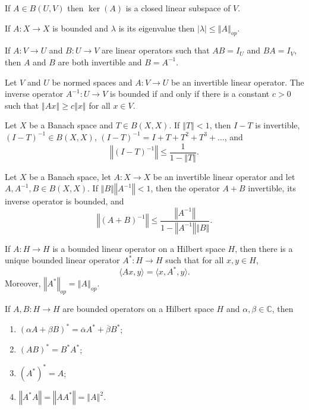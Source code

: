 \documentclass[a4paper]{article}
\newcommand{\C}{\mathbb{C}}
\newcommand{\norm}[1]{\left\Vert #1 \right\Vert}
\newcommand{\oneover}[1]{\frac{1}{#1}}
\newcommand{\<}{\langle}
\renewcommand{\>}{\rangle}
\renewcommand{\a}{\alpha}
\renewcommand{\b}{\beta}
\newcommand{\la}{\lambda}
\newcommand{\inv}{^{-1}}
\begin{document}
\begin{prop}
  If $A\in B(U,V)$ then $\ker(A)$ is a closed linear subspace of $V$.
\end{prop}

\begin{prop}
  If $A:X\to X$ is bounded and $\la$ is its eigenvalue then $|\la|\leq\norm{A}_{op}$.
\end{prop}

\begin{lemma}
  If $A:V\to U$ and $B:U\to V$ are linear operators such that $AB=I_U$ and $BA=I_V$, then $A$ and $B$ are both invertible and $B=A^{-1}$.
\end{lemma}

\begin{prop}
  Let $V$ and $U$ be normed spaces and $A:V\to U$ be an invertible linear operator. The inverse operator $A^{-1}:U\to V$ is bounded if and only if there is a constant $c>0$ such that $\norm{Ax}\geq c\norm{x}$ for all $x\in V$.
\end{prop}

\begin{lemma}
  Let $X$ be a Banach space and $T\in B(X,X)$. If $\norm{T}<1$, then $I-T$ is invertible, $(I-T)\inv\in B(X,X)$, $(I-T)\inv = I+T+T^2+T^3+\ldots$, and
  $$\norm{(I-T)\inv}\leq \oneover{1-\norm{T}}.$$
\end{lemma}

\begin{prop}
  Let $X$ be a Banach space, let $A:X\to X$ be an invertible linear operator and let $A,A\inv,B\in B(X,X)$. If $\norm{B}\norm{A\inv}<1$, then the operator $A+B$ invertible, its inverse operator is bounded, and
  $$\norm{(A+B)\inv}\leq\frac{\norm{A\inv}}{1-\norm{A\inv}\norm{B}}.$$
\end{prop}

\begin{thm}
  If $A:H\to H$ is a bounded linear operator on a Hilbert space $H$, then there is a unique bounded linear operator $A^*:H\to H$ such that for all $x,y\in H$,
  $$\<Ax,y\> = \<x,A^*,y\>.$$
  Moreover, $\norm{A^*}_{op} = \norm{A}_{op}$.
\end{thm}

\begin{lemma}
  If $A,B:H\to H$ are bounded operators on a Hilbert space $H$ and $\a,\b\in\C$, then
  \begin{enumerate}
    \item $(\a A+\b B)^* = \overline{\a}A^* + \overline{\b}B^*$;
    \item $(AB)^* = B^*A^*$;
    \item $(A^*)^* = A$;
    \item $\norm{A^*A} = \norm{AA^*} = \norm{A}^2$.
  \end{enumerate}
\end{lemma}
\end{document}
